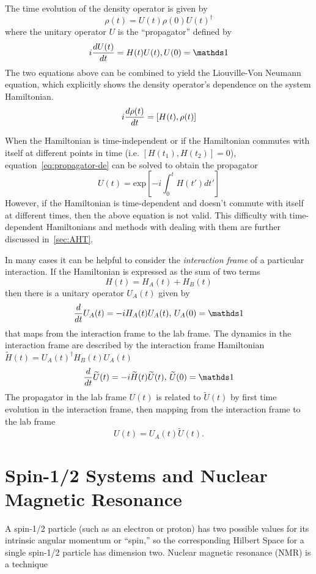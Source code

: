 The time evolution of the density operator is given by
\begin{equation}\label{eq:density-time}
    \rho(t) = U(t) \rho(0) U(t)^\dagger
\end{equation}
where the unitary operator $U$ is the ``propagator'' defined by
\begin{equation}\label{eq:propagator-de}
    i \ddt{U(t)} = H(t) U(t), U(0) = \identity
\end{equation}
The two equations above can be combined to yield the Liouville-Von Neumann equation, which explicitly shows the density operator's dependence on the system Hamiltonian.
\begin{equation}
    i \frac{d \rho(t)}{dt} = [H(t), \rho(t)]
\end{equation}

When the Hamiltonian is time-independent or if the Hamiltonian commutes with itself at different points in time (i.e. $[H(t_1), H(t_2)] = 0$), equation~\ref{eq:propagator-de} can be solved to obtain the propagator
\[
U(t) = \text{exp}\left[ {-i \int_0^t H(t') dt'} \right]
\]
However, if the Hamiltonian is time-dependent and doesn't commute with itself at different times, then the above equation is not valid. This difficulty with time-dependent Hamiltonians and methods with dealing with them are further discussed in~\ref{sec:AHT}.

In many cases it can be helpful to consider the \emph{interaction frame} of a particular interaction. If the Hamiltonian is expressed as the sum of two terms
\[
H(t) = H_A(t) + H_B(t)
\]
then there is a unitary operator $U_A(t)$ given by
\[
\frac{d}{dt} U_A(t) = -i H_A(t) U_A(t), \, U_A(0) = \identity
\]
that maps from the interaction frame to the lab frame.
The dynamics in the interaction frame are described by the interaction frame Hamiltonian $\widetilde{H}(t) = {U_A(t)}^{\dagger} H_B(t)U_A(t)$
\[
\frac{d}{dt}\widetilde{U}(t) = -i \widetilde{H}(t)\widetilde{U}(t),\, \widetilde{U}(0) = \identity
\]
The propagator in the lab frame $U(t)$ is related to $\widetilde{U}(t)$ by first time evolution in the interaction frame, then mapping from the interaction frame to the lab frame
\[
U(t) = U_A(t)\widetilde{U}(t).
\]

\section{Spin-1/2 Systems and Nuclear Magnetic Resonance}

A spin-1/2 particle (such as an electron or proton) has two possible values for its intrinsic angular momentum or ``spin,'' so the corresponding Hilbert Space for a single spin-1/2 particle has dimension two.
Nuclear magnetic resonance (NMR) is a technique

